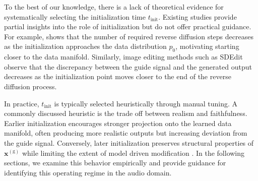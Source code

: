 \documentclass[twoside,a4paper]{article}
\begin{document}
To the best of our knowledge, there is a lack of theoretical evidence for systematically selecting the initialization time $t_\text{init}$. Existing studies provide partial insights into the role of initialization but do not offer practical guidance. For example, \cite{chung2022comecloserdiffusefasteracceleratingconditionaldiffusion} shows that the number of required reverse diffusion steps decreases as the initialization approaches the data distribution $p_0$, motivating starting closer to the data manifold. Similarly, image editing methods such as SDEdit \cite{meng2022sdeditguidedimagesynthesis} observe that the discrepancy between the guide signal and the generated output decreases as the initialization point moves closer to the end of the reverse diffusion process.

In practice, $t_\text{init}$ is typically selected heuristically through manual tuning. A commonly discussed heuristic is the trade off between realism and faithfulness. Earlier initialization encourages stronger projection onto the learned data manifold, often producing more realistic outputs but increasing deviation from the guide signal. Conversely, later initialization preserves structural properties of $\mathbf{x}^{(\mathrm g)}$ while limiting the extent of model driven modification \cite{meng2022sdeditguidedimagesynthesis, moliner2024buddysinglechannelblindunsupervised}. In the following sections, we examine this behavior empirically and provide guidance for identifying this operating regime in the audio domain.


\end{document}
